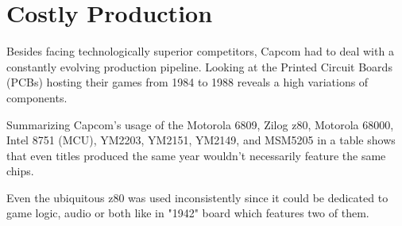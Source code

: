 \section{Costly Production}
Besides facing technologically superior competitors, Capcom had to deal with a constantly evolving production pipeline. Looking at the Printed Circuit Boards (PCBs) hosting their games from 1984 to 1988 reveals a high variations of components.

Summarizing Capcom's usage of the Motorola 6809, Zilog z80, Motorola 68000, Intel 8751 (MCU), YM2203, YM2151, YM2149, and MSM5205 in a table shows that even titles produced the same year wouldn't necessarily feature the same chips. 

Even the ubiquitous z80 was used inconsistently since it could be dedicated to game logic, audio or both like in "1942" board which features two of them.



